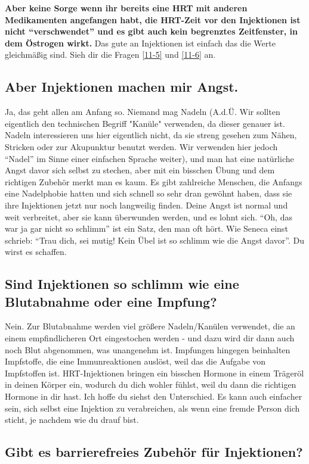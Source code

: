 \documentclass{article}
\begin{document}
\textbf{Aber keine Sorge wenn ihr bereits eine HRT mit anderen Medikamenten angefangen habt, die HRT-Zeit vor den Injektionen ist nicht “verschwendet” und es gibt auch kein begrenztes Zeitfenster, in dem Östrogen wirkt.} Das gute an Injektionen ist einfach das die Werte gleichmäßig sind. Sieh dir die Fragen \ref{11-5} und \ref{11-6} an.

\subsection{Aber Injektionen machen mir Angst.}
Ja, das geht allen am Anfang so. Niemand mag Nadeln  (A.d.Ü. Wir sollten eigentlich den technischen Begriff "Kanüle" verwenden, da dieser genauer ist. Nadeln interessieren uns hier eigentlich nicht, da sie streng gesehen zum Nähen, Stricken oder zur Akupunktur benutzt werden. Wir verwenden hier jedoch “Nadel” im Sinne einer einfachen Sprache weiter), und man hat eine natürliche Angst davor sich selbst zu stechen, aber mit ein bisschen Übung und dem richtigen Zubehör merkt man es kaum. Es gibt zahlreiche Menschen, die Anfangs eine Nadelphobie hatten und sich schnell so sehr dran gewöhnt haben, dass sie ihre Injektionen jetzt nur noch langweilig finden. Deine Angst ist normal und weit verbreitet, aber sie kann überwunden werden, und es lohnt sich. “Oh, das war ja gar nicht so schlimm” ist ein Satz, den man oft hört. Wie Seneca einst schrieb: “Trau dich, sei mutig! Kein Übel ist so schlimm wie die Angst davor”. Du wirst es schaffen.

\subsection{Sind Injektionen so schlimm wie eine Blutabnahme oder eine Impfung?}

Nein. Zur Blutabnahme werden viel größere Nadeln/Kanülen verwendet, die an einem empfindlicheren Ort eingestochen werden - und dazu wird dir dann auch noch Blut abgenommen, was unangenehm ist. Impfungen hingegen beinhalten Impfstoffe, die eine Immunreaktionen auslöst, weil das die Aufgabe von Impfstoffen ist. HRT-Injektionen bringen ein bisschen Hormone in einem Trägeröl in deinen Körper ein, wodurch du dich wohler fühlst, weil du dann die richtigen Hormone in dir hast. Ich hoffe du siehst den Unterschied. Es kann auch einfacher sein, sich selbst eine Injektion zu verabreichen, als wenn eine fremde Person dich sticht, je nachdem wie du drauf bist.

\subsection{Gibt es barrierefreies Zubehör für Injektionen?}
\end{document}
